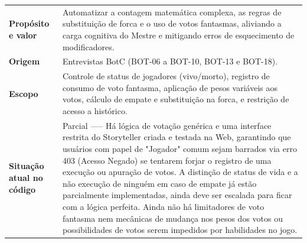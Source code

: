 \documentclass[12pt,a4paper]{article}
\begin{document}
\renewcommand{\arraystretch}{1.5}
\begin{table}[H]
    \centering
    \begin{tabular}{|m{4.5cm} | m{11cm}|}
    \hline
    \textbf{Propósito e valor} &
    Automatizar a contagem matemática complexa, as regras de substituição de forca e o uso de votos fantasmas, aliviando a carga cognitiva do Mestre e mitigando erros de esquecimento de modificadores. \\
    \textbf{Origem} & Entrevistas BotC (BOT-06 a BOT-10, BOT-13 e BOT-18). \\
    \textbf{Escopo} & Controle de status de jogadores (vivo/morto), registro de consumo de voto fantasma, aplicação de pesos variáveis aos votos, cálculo de empate e substituição na forca, e restrição de acesso a histórico. \\
    \textbf{Situação atual no código} & Parcial --— Há lógica de votação genérica e uma interface restrita do Storyteller criada e testada na Web, garantindo que usuários com papel de "Jogador" comum sejam barrados via erro 403 (Acesso Negado) se tentarem forjar o registro de uma execução ou apuração de votos. A distinção de status de vida e a não execução de ninguém em caso de empate já estão parcialmente implementadas, ainda deve ser escalada para ficar com a lógica perfeita. Ainda não há limitadores de voto fantasma nem mecânicas de mudança nos pesos dos votos ou possibilidades de votos serem impedidos por habilidades no jogo. \\
    \hline
    \end{tabular}
\end{table}

\vspace{0.5cm}
\end{document}
